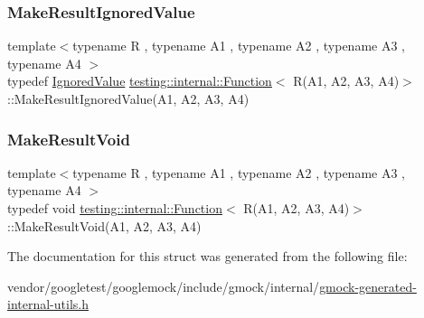 \mbox{\label{structtesting_1_1internal_1_1_function_3_01_r_07_a1_00_01_a2_00_01_a3_00_01_a4_08_4_a6736086d1c8ba25788add1e5180207f9}} 
\subsubsection{\texorpdfstring{Make\+Result\+Ignored\+Value}{MakeResultIgnoredValue}}
{\footnotesize\ttfamily template$<$typename R , typename A1 , typename A2 , typename A3 , typename A4 $>$ \\
typedef \hyperlink{classtesting_1_1internal_1_1_ignored_value}{Ignored\+Value} \hyperlink{structtesting_1_1internal_1_1_function}{testing\+::internal\+::\+Function}$<$ R(A1, A2, A3, A4)$>$\+::Make\+Result\+Ignored\+Value(A1, A2, A3, A4)}

\mbox{\label{structtesting_1_1internal_1_1_function_3_01_r_07_a1_00_01_a2_00_01_a3_00_01_a4_08_4_af7462da27e87a9d580e7f9748ebc5754}} 
\subsubsection{\texorpdfstring{Make\+Result\+Void}{MakeResultVoid}}
{\footnotesize\ttfamily template$<$typename R , typename A1 , typename A2 , typename A3 , typename A4 $>$ \\
typedef void \hyperlink{structtesting_1_1internal_1_1_function}{testing\+::internal\+::\+Function}$<$ R(A1, A2, A3, A4)$>$\+::Make\+Result\+Void(A1, A2, A3, A4)}



The documentation for this struct was generated from the following file\+:\begin{DoxyCompactItemize}
\item 
vendor/googletest/googlemock/include/gmock/internal/\hyperlink{gmock-generated-internal-utils_8h}{gmock-\/generated-\/internal-\/utils.\+h}\end{DoxyCompactItemize}
